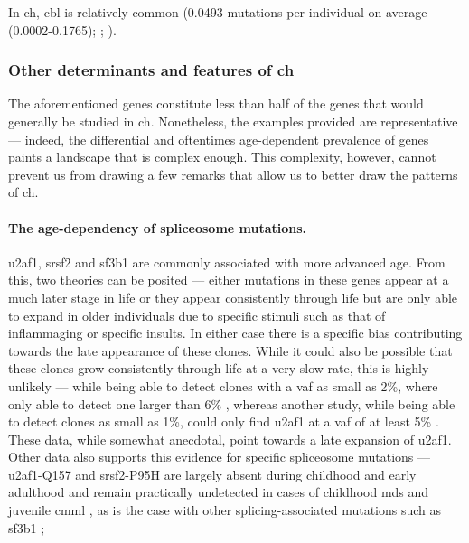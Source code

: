 In \ac{ch}, \ac{cbl} is relatively common \cite{Jaiswal2014-rl,Genovese2014-eu,Zink2017-zi,Bolton2020-ct,Coombs2017-ph,Acuna-Hidalgo2017-ng,Young2016-du,Young2019-rz} (0.0493 mutations per individual on average (0.0002-0.1765); ; ).

\subsubsection{Other determinants and features of \ac{ch}}

The aforementioned genes constitute less than half of the genes that would generally be studied in \ac{ch}. Nonetheless, the examples provided are representative --- indeed, the differential and oftentimes age-dependent prevalence of genes paints a landscape that is complex enough. This complexity, however, cannot prevent us from drawing a few remarks that allow us to better draw the patterns of \ac{ch}.

\paragraph{The age-dependency of spliceosome mutations.} \Ac{u2af1}, \ac{srsf2} and \ac{sf3b1} are commonly associated with more advanced age. From this, two theories can be posited --- either mutations in these genes appear at a much later stage in life or they appear consistently through life but are only able to expand in older individuals due to specific stimuli such as that of inflammaging \cite{Franceschi2018-be} or specific insults. In either case there is a specific bias contributing towards the late appearance of these clones. While it could also be possible that these clones grow consistently through life at a very slow rate, this is highly unlikely --- while being able to detect clones with a \ac{vaf} as small as 2\%,  where only able to detect one larger than 6\% \cite{Jaiswal2014-rl}, whereas another study, while being able to detect clones as small as 1\%, could only find \ac{u2af1} at a \ac{vaf} of at least 5\% \cite{Zehir2017-gh}. These data, while somewhat anecdotal, point towards a late expansion of \ac{u2af1}. Other data also supports this evidence for specific spliceosome mutations --- \ac{u2af1}-Q157 and \ac{srsf2}-P95H are largely absent during childhood and early adulthood and remain practically undetected in cases of childhood \ac{mds} and juvenile \ac{cmml} \cite{Kar2013-nw,Hirabayashi2012-jj}, as is the case with other splicing-associated mutations such as \ac{sf3b1} \cite{Lin2014-qr};

